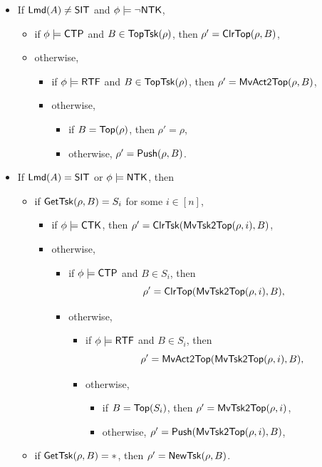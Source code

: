 \noindent {}
\begin{itemize}
	\item If ${\sf Lmd}(A) \neq {\sf SIT}$ and $\phi \models \neg {\sf NTK}$, 
	\begin{itemize}
		\item if $\phi \models{\sf CTP}$ and $B \in \mathsf{TopTsk}(\rho)$, then $\rho' =\mathsf{ClrTop}(\rho, B)$,
		\item otherwise,
		\begin{itemize}
			\item if $\phi \models {\sf RTF}$ and $B \in \mathsf{TopTsk}(\rho)$, then $\rho'=\mathsf{MvAct2Top}(\rho, B)$,
			\item otherwise,
			\begin{itemize}
				\item if $B = \mathsf{Top}(\rho)$, then $\rho' = \rho$,
				\item otherwise, $\rho' = \mathsf{Push}(\rho, B)$.
			\end{itemize}
		\end{itemize}
	\end{itemize}
	\item If ${\sf Lmd}(A) = {\sf SIT}$ or $\phi \models {\sf NTK}$, then
	\begin{itemize}
		\item if $\mathsf{GetTsk}(\rho, B) = S_i$ for some $i\in[n]$,
		\begin{itemize}
			\item if $\phi \models{\sf CTK}$, then $\rho' = \mathsf{ClrTsk}(\mathsf{MvTsk2Top}(\rho, i), B)$,
			\item otherwise, 
			\begin{itemize}
				\item if $\phi \models{\sf CTP}$ and $B \in S_i$, then 
				$$\rho' =\mathsf{ClrTop}(\mathsf{MvTsk2Top}(\rho, i), B),$$
				\item otherwise,
				\begin{itemize}
					\item if $\phi \models {\sf RTF}$ and $B \in S_i$, then 
					$$\rho'=\mathsf{MvAct2Top}(\mathsf{MvTsk2Top}(\rho, i), B),$$
					\item otherwise,
					\begin{itemize}
						\item if $B = \mathsf{Top}(S_i)$, then $\rho' = \mathsf{MvTsk2Top}(\rho, i)$,
						\item otherwise, $\rho'=\mathsf{Push}(\mathsf{MvTsk2Top}(\rho, i), B)$,
					\end{itemize}
				\end{itemize}
			\end{itemize}
		\end{itemize}
		\item if $\mathsf{GetTsk}(\rho, B) = *$, then $\rho' = \mathsf{NewTsk}(\rho, B)$.
	\end{itemize}
\end{itemize}

